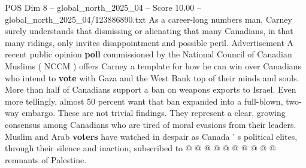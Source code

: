 \begin{textsample}{POS Dim 8 – global\_north\_2025\_04 – Score 10.00 – global\_north\_2025\_04/123886890.txt}
As a career-long numbers man, Carney surely understands that dismissing or alienating that many Canadians, in that many ridings, only invites disappointment and possible peril.
Advertisement A recent public opinion \textbf{poll} commissioned by the National Council of Canadian Muslims ( NCCM ) offers Carney a template for how he can win over Canadians who intend to \textbf{vote} with Gaza and the West Bank top of their minds and souls.
More than half of Canadians support a ban on weapons exports to Israel.
Even more tellingly, almost 50 percent want that ban expanded into a full-blown, two-way embargo.
These are not trivial findings.
They represent a clear, growing consensus among Canadians who are tired of moral evasions from their leaders.
Muslim and Arab \textbf{voters} have watched in despair as Canada ' s political elites, through their silence and inaction, subscribed to @ @ @ @ @ @ @ @ @ @ remnants of Palestine.

\end{textsample}
